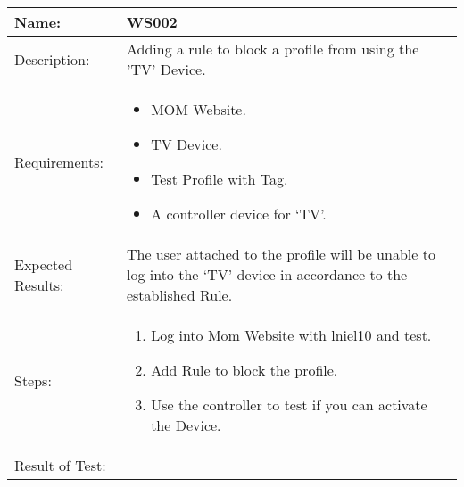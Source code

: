 \begin{table}[h]
	\centering
		\begin{tabular*}{\textwidth}{|l|l|}
		\hline
		\hline
		Name: & WS002\\
		\hline
		Description: & \parbox{0.70\textwidth}{Adding a rule to block a profile from using the 'TV' Device.}\\
		\hline
		Requirements: & \parbox{0.70\textwidth}{
		\begin{itemize}
			\item MOM Website.
			\item TV Device.
			\item Test Profile with Tag.
			\item A controller device for `TV'.
		\end{itemize}}
		\\
		\hline
		Expected Results: & \parbox{.70\textwidth}{The user attached to the profile will be unable to log into the `TV' device in accordance to the established Rule.}\\
		\hline
		Steps: & \parbox{.70\textwidth}{
		\begin{enumerate}
			\item Log into Mom Website with lniel10 and test.
			\item Add Rule to block the profile.
			\item Use the controller to test if you can activate the Device.
		\end{enumerate}}
		\\		
		\hline
		Result of Test: & \\
		\hline
		\end{tabular*}
\end{table}


